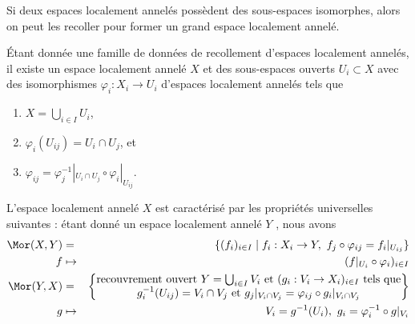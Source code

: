 \begin{lemma}
\label{lemma-glue}
\begin{slogan}
Si deux espaces localement annelés possèdent des sous-espaces isomorphes, alors
on peut les recoller pour former un
grand espace localement annelé.
\end{slogan}
Étant donnée une famille de données de recollement d'espaces localement annelés, il existe un
espace localement annelé  $X$  et des sous-espaces ouverts  $U_i \subset X$ 
avec des isomorphismes  $\varphi_i : X_i \to U_i$  d'espaces localement annelés tels que
\begin{enumerate}
\item $X=\bigcup_{i\in I} U_i$,
\item $\varphi_i(U_{ij}) = U_i \cap U_j$, et
\item $\varphi_{ij} =
\varphi_j^{-1}|_{U_i \cap U_j} \circ \varphi_i|_{U_{ij}}$.
\end{enumerate}
L'espace localement annelé  $X$  est caractérisé par les propriétés
universelles suivantes : étant donné un espace localement annelé  $Y$ , nous
avons
\begin{eqnarray*}
\Mor(X, Y) & = & \{ (f_i)_{i\in I} \mid
f_i : X_i \to Y, \ f_j \circ \varphi_{ij} = f_i|_{U_{ij}}\} \\
f & \mapsto & (f|_{U_i} \circ \varphi_i)_{i \in I} \\
\Mor(Y, X) & = &
\left\{
\begin{matrix}
\text{recouvrement ouvert }Y = \bigcup\nolimits_{i \in I} V_i\text{ et }
(g_i : V_i \to X_i)_{i \in I}
\text{ tels que}\\
g_i^{-1}(U_{ij}) = V_i \cap V_j
\text{ et }
g_j|_{V_i \cap V_j} = \varphi_{ij} \circ g_i|_{V_i \cap V_j}
\end{matrix}
\right\} \\
g & \mapsto &
V_i = g^{-1}(U_i), \ g_i = \varphi_i^{-1} \circ g|_{V_i}
\end{eqnarray*}
\end{lemma}

